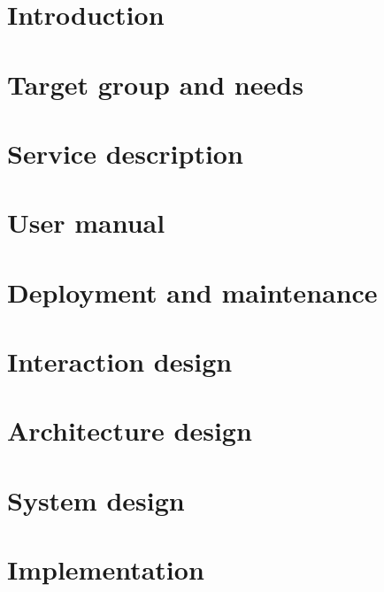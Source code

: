 \chapter{Introduction}


\chapter{Target group and needs}




\chapter{Service description}


\chapter{User manual}


\chapter{Deployment and maintenance}


\chapter{Interaction design}


\chapter{Architecture design}


\chapter{System design}


\chapter{Implementation}


%

%




